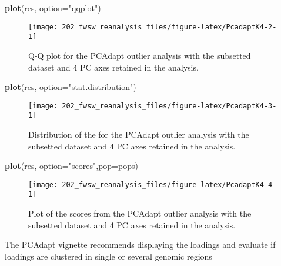 \documentclass[11pt,]{article}
\newenvironment{Shaded}{\begin{snugshade}}{\end{snugshade}}
\newcommand{\KeywordTok}[1]{\textcolor[rgb]{0.13,0.29,0.53}{\textbf{#1}}}
\newcommand{\DataTypeTok}[1]{\textcolor[rgb]{0.13,0.29,0.53}{#1}}
\newcommand{\DecValTok}[1]{\textcolor[rgb]{0.00,0.00,0.81}{#1}}
\newcommand{\FloatTok}[1]{\textcolor[rgb]{0.00,0.00,0.81}{#1}}
\newcommand{\StringTok}[1]{\textcolor[rgb]{0.31,0.60,0.02}{#1}}
\newcommand{\ControlFlowTok}[1]{\textcolor[rgb]{0.13,0.29,0.53}{\textbf{#1}}}
\newcommand{\OperatorTok}[1]{\textcolor[rgb]{0.81,0.36,0.00}{\textbf{#1}}}
\newcommand{\NormalTok}[1]{#1}
\begin{document}
\begin{Shaded}
\begin{Highlighting}[]
\KeywordTok{plot}\NormalTok{(res, }\DataTypeTok{option=}\StringTok{"qqplot"}\NormalTok{)}
\end{Highlighting}
\end{Shaded}

\begin{figure}[H]
\texttt{[image: 202\_fwsw\_reanalysis\_files/figure-latex/PcadaptK4-2-1]} \caption{Q-Q plot for the PCAdapt outlier analysis with the subsetted dataset and 4 PC axes retained in the analysis.}\label{fig:PcadaptK4-2}
\end{figure}

\begin{Shaded}
\begin{Highlighting}[]
\KeywordTok{plot}\NormalTok{(res, }\DataTypeTok{option=}\StringTok{"stat.distribution"}\NormalTok{)}
\end{Highlighting}
\end{Shaded}

\begin{figure}[H]
\texttt{[image: 202\_fwsw\_reanalysis\_files/figure-latex/PcadaptK4-3-1]} \caption{Distribution of the  for the PCAdapt outlier analysis with the subsetted dataset and 4 PC axes retained in the analysis.}\label{fig:PcadaptK4-3}
\end{figure}

\begin{Shaded}
\begin{Highlighting}[]
\KeywordTok{plot}\NormalTok{(res, }\DataTypeTok{option=}\StringTok{"scores"}\NormalTok{,}\DataTypeTok{pop=}\NormalTok{pops)}
\end{Highlighting}
\end{Shaded}

\begin{figure}[H]
\texttt{[image: 202\_fwsw\_reanalysis\_files/figure-latex/PcadaptK4-4-1]} \caption{Plot of the scores from the PCAdapt outlier analysis with the subsetted dataset and 4 PC axes retained in the analysis.}\label{fig:PcadaptK4-4}
\end{figure}

The PCAdapt vignette recommends displaying the loadings and evaluate if
loadings are clustered in single or several genomic regions

\begin{Shaded}
\end{Shaded}
\end{document}
